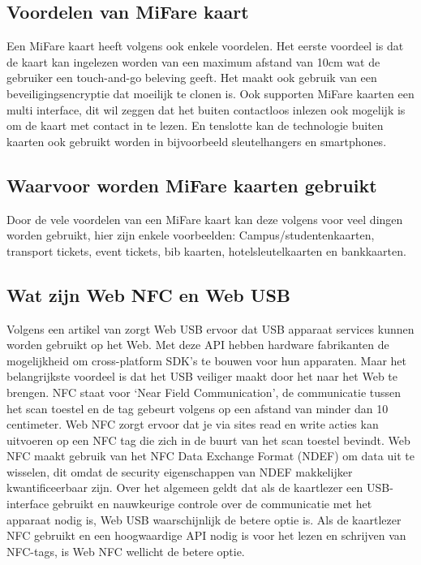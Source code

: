 \subsection{Voordelen van MiFare kaart}
Een MiFare kaart heeft volgens \textcite{Printplast} ook enkele voordelen. Het eerste voordeel is dat de kaart kan ingelezen worden van een maximum afstand van 10cm wat de gebruiker een touch-and-go beleving geeft.
Het maakt ook gebruik van een beveiligingsencryptie dat moeilijk te clonen is. Ook supporten MiFare kaarten een multi interface, dit wil zeggen dat het buiten contactloos inlezen ook mogelijk is om de kaart met contact in te lezen. En tenslotte kan de technologie buiten kaarten ook gebruikt worden in bijvoorbeeld sleutelhangers en smartphones.

\subsection{Waarvoor worden MiFare kaarten gebruikt}
Door de vele voordelen van een MiFare kaart kan deze volgens \textcite{Digitalid} voor veel dingen worden gebruikt, hier zijn enkele voorbeelden: Campus/studentenkaarten, transport tickets, event tickets, bib kaarten, hotelsleutelkaarten en bankkaarten.

\subsection{Wat zijn Web NFC en Web USB}
Volgens een artikel van \textcite{FrançoisBeaufortUSB} zorgt Web USB ervoor dat USB apparaat services kunnen worden gebruikt op het Web. Met deze API hebben hardware fabrikanten de mogelijkheid om cross-platform SDK’s te bouwen voor hun apparaten. Maar het belangrijkste voordeel is dat het USB veiliger maakt door het naar het Web te brengen.
NFC staat voor ‘Near Field Communication’, de communicatie tussen het scan toestel en de tag gebeurt volgens \textcite{FrançoisBeaufortNFC} op een afstand van minder dan 10 centimeter. Web NFC zorgt ervoor dat je via sites read en write acties kan uitvoeren op een NFC tag die zich in de buurt van het scan toestel bevindt. Web NFC maakt gebruik van het NFC Data Exchange Format (NDEF) om data uit te wisselen, dit omdat de security eigenschappen van NDEF makkelijker kwantificeerbaar zijn.
Over het algemeen geldt dat als de kaartlezer een USB-interface gebruikt en nauwkeurige controle over de communicatie met het apparaat nodig is, Web USB waarschijnlijk de betere optie is. Als de kaartlezer NFC gebruikt en een hoogwaardige API nodig is voor het lezen en schrijven van NFC-tags, is Web NFC wellicht de betere optie.

